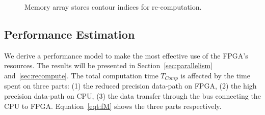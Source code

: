 \setcounter{subfigure}{0}
\begin{figure}[t!]
\centering
{}
\caption{Memory array stores contour indices for re-computation.}
\label{fig:memory}
\end{figure}

\subsection{Performance Estimation}
\label{sec:model}

We derive a performance model to make the most effective use of the FPGA's resources.
The results will be presented in Section~\ref{sec:parallelism} and~\ref{sec:recompute}.
The total computation time $T_{Comp}$ is affected by the time spent on three parts:
(1) the reduced precision data-path on FPGA,
(2) the high precision data-path on CPU,
(3) the data transfer through the bus connecting the CPU to FPGA.
Equation~\ref{eqt:fM} shows the three parts respectively.


